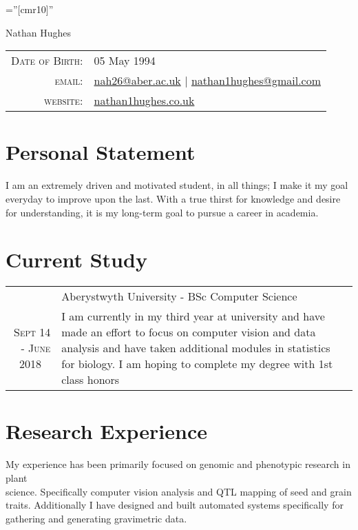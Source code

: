 \documentclass[a4paper,9pt]{article}
\begin{document}
\pagestyle{empty} %

\font\fb=''[cmr10]'' %

\par{\centering
  {\Huge Nathan {Hughes}
  }\bigskip\par}


\begin{center}
  \begin{tabular}{rl}
    \textsc{Date of Birth:} & 05 		May 1994 \\
    \textsc{email:}     & \href{mailto:nah26@aber.ac.uk}{nah26@aber.ac.uk} | \href{mailto:nathan1hughes@gmail.com}{nathan1hughes@gmail.com} \\
    \textsc{website:}  & \href{nathan1hughes.co.uk}{nathan1hughes.co.uk}       
  \end{tabular}
\end{center}


\section{Personal Statement}
I am an extremely driven and motivated student, in all things; I make it my goal everyday to improve upon the last. With a true thirst for knowledge and desire for understanding, it is my long-term goal to pursue a career in academia.
\section{Current Study}


\begin{tabular}{rp{11cm}}
  &Aberystwyth University - BSc Computer Science\\\textsc{Sept 14 - June 2018 \  }&\footnotesize{I am currently in my third year at university and have made an effort to focus on computer vision and data analysis and have taken additional modules in statistics for biology. I am hoping to complete my degree with 1st class honors}
 \end{tabular}

\section{Research Experience}
My experience has been primarily focused on genomic and phenotypic research in plant \\science. Specifically computer vision analysis and QTL mapping of seed and grain traits. Additionally I have designed and built automated systems specifically for gathering and generating gravimetric data.
\end{document}
